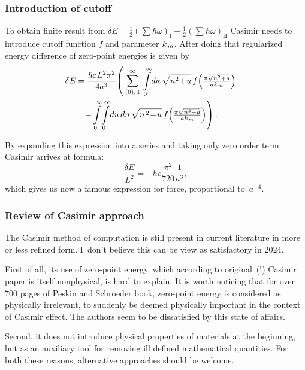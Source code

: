 \documentclass[10pt,t]{beamer}
\begin{document}
\begin{frame}
  \frametitle{Introduction of cutoff}


  To obtain finite result from
  $\delta E = \frac{ 1 }{ 2 } ( \sum \hbar \omega )_{ \text{I} } -
  \frac{ 1 }{ 2 } ( \sum \hbar \omega )_{ \text{II} }$ Casimir needs to introduce
  cutoff function $f$ and parameter $k_{ \hspace{0.09em} m }$.
  After doing that regularized energy difference of zero-point energies is
  given by
  \begin{equation}
    \label{eq:Short-history-ETC-03}
    \begin{split}
      \delta E
      &=
        \frac{ \hbar c \HorSpaceFive L^{ 2 } \pi^{ 2 } }{ 4 a^{ 3 } } \!
        \left( \, \sum_{ ( 0 ), \, 1 }^{ \infty } \,
        \int\limits_{ 0 }^{ \infty } \! d\kappa \, \sqrt{ n^{ 2 } \! + \! u } \,
        f\!\left( \tfrac{ \pi \sqrt{ n^{ 2 } + u } }{ a k_{ \HorSpaceTwo m } }
        \right) \right. \, - \\
      &\left. \;\;\;
        - \int\limits_{ 0 }^{ \infty } \! \int\limits_{ 0 }^{ \infty } \! du \, dn \,
        \sqrt{ n^{ \, 2 } \! + \! u } \,
        f\!\left( \tfrac{ \pi \sqrt{ n^{ 2 } + u } }{
        a k_{ \HorSpaceTwo m } } \right) \right).
    \end{split}
  \end{equation}

  By expanding this expression into a series and taking only zero order term
  Casimir arrives at formula:
  \begin{equation}
    \label{eq:Short-history-ETC-04}
    \frac{ \delta E }{ L^{ 2 } } =
    -\hbar c \frac{ \pi^{ 2 } }{ 720 } \frac{ 1 }{ a^{ 3 } },
  \end{equation}
  which gives us now a famous expression for force, proportional
  to~$a^{ -4 }$.

\end{frame}





\begin{frame}
  \frametitle{Review of Casimir approach}


  The Casimir method of computation is still present in current literature
  in more or less refined form. I~don't believe this can be view
  as satisfactory in $2024$.

  First of all, its use of zero-point energy, which according to
  original~(!) Casimir paper is itself nonphysical, is hard to explain.
  It is worth noticing that for over $700$ pages of Peskin and Schroeder
  book, zero-point energy is considered as physically irrelevant, to
  suddenly be deemed physically important in the context of Casimir
  effect. The authors seem to be dissatisfied by this state of affairs.

  Second, it does not introduce physical properties of materials at the
  beginning, but as an auxiliary tool for removing ill defined mathematical
  quantities. For both these reasons, alternative approaches should be
  welcome.

\end{frame}
\end{document}

